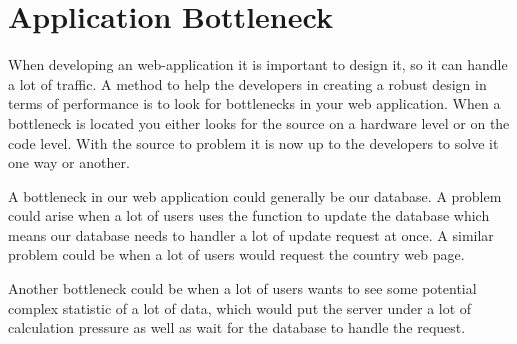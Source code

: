 \section{Application Bottleneck}
When developing an web-application it is important to design it, so it can handle a lot of traffic. A method to help the developers in creating a robust design in terms of performance is to look for bottlenecks in your web application. When a bottleneck is located you either looks for the source on a hardware level or on the code level. With the source to problem it is now up to the developers to solve it one way or another.

A bottleneck in our web application could generally be our database. A problem could arise when a lot of users uses the function to update the database which means our database needs to handler a lot of update request at once. A similar problem could be when a lot of users would request the country web page.

Another bottleneck could be when a lot of users wants to see some potential complex statistic of a lot of data, which would put the server under a lot of calculation pressure as well as wait for the database to handle the request.